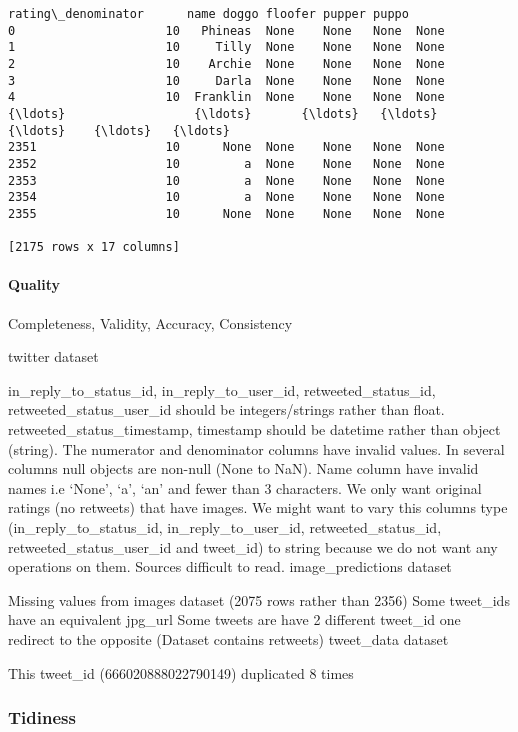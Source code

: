\documentclass[11pt]{article}
\begin{document}
\begin{tcolorbox}[breakable, size=fbox, boxrule=.5pt, pad at break*=1mm, opacityfill=0]
\begin{Verbatim}[commandchars=\\\{\}]
      rating\_denominator      name doggo floofer pupper puppo
0                     10   Phineas  None    None   None  None
1                     10     Tilly  None    None   None  None
2                     10    Archie  None    None   None  None
3                     10     Darla  None    None   None  None
4                     10  Franklin  None    None   None  None
{\ldots}                  {\ldots}       {\ldots}   {\ldots}     {\ldots}    {\ldots}   {\ldots}
2351                  10      None  None    None   None  None
2352                  10         a  None    None   None  None
2353                  10         a  None    None   None  None
2354                  10         a  None    None   None  None
2355                  10      None  None    None   None  None

[2175 rows x 17 columns]
\end{Verbatim}
\end{tcolorbox}
        
    \hypertarget{quality}{%
\paragraph{Quality}\label{quality}}

Completeness, Validity, Accuracy, Consistency

twitter dataset

in\_reply\_to\_status\_id, in\_reply\_to\_user\_id,
retweeted\_status\_id, retweeted\_status\_user\_id should be
integers/strings rather than float. retweeted\_status\_timestamp,
timestamp should be datetime rather than object (string). The numerator
and denominator columns have invalid values. In several columns null
objects are non-null (None to NaN). Name column have invalid names i.e
`None', `a', `an' and fewer than 3 characters. We only want original
ratings (no retweets) that have images. We might want to vary this
columns type (in\_reply\_to\_status\_id, in\_reply\_to\_user\_id,
retweeted\_status\_id, retweeted\_status\_user\_id and tweet\_id) to
string because we do not want any operations on them. Sources difficult
to read. image\_predictions dataset

Missing values from images dataset (2075 rows rather than 2356) Some
tweet\_ids have an equivalent jpg\_url Some tweets are have 2 different
tweet\_id one redirect to the opposite (Dataset contains retweets)
tweet\_data dataset

This tweet\_id (666020888022790149) duplicated 8 times

    \hypertarget{tidiness}{%
\subsubsection{Tidiness}\label{tidiness}}
\end{document}
